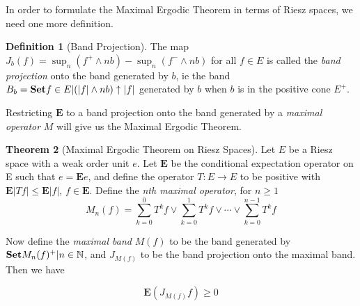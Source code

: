 \documentclass[letterpaper,10pt,oneside,onecolumn,reqno]{amsart}
\newcommand{\NN}{\mathbb N}
\theoremstyle{definition}
\newtheorem{thm}{Theorem}
\newtheorem{defn}[thm]{Definition}
\newcommand{\catname}[1]{{\normalfont\textbf{#1}}}
\newcommand{\Set}{\catname{Set}}
\begin{document}
In order to formulate the Maximal Ergodic Theorem in terms of Riesz spaces, we need one more definition. 

\begin{defn}[Band Projection]
The map $J_b(f) = \sup_n (f^+ \wedge nb) - \sup_n(f^- \wedge nb)$ for all $f \in E$ is called the \emph{band projection} onto the band generated by $b$, ie the band $B_b = \Set{f \in E | (|f| \wedge nb) \uparrow |f|}$ generated by $b$ when $b$ is in the positive cone $E^+$. 
\end{defn}

Restricting $\mathbf{E}$ to a band projection onto the band generated by a \emph{maximal operator} $M$ will give us the Maximal Ergodic Theorem.


\begin{thm}[Maximal Ergodic Theorem on Riesz Spaces]
Let $E$ be a Riesz space with a weak order unit $e$. Let $\mathbf{E}$ be the conditional expectation operator on E such that $e = \mathbf{E}e$, and define the operator $T : E \to E$ to be positive with $\mathbf{E}|Tf| \leq \mathbf{E}|f|$, $f \in \mathbf{E}$. Define the \emph{nth maximal operator}, for $n \geq 1$
\begin{equation}
M_n(f) = \sum\limits_{k=0}^{0} T^kf \vee \sum\limits_{k=0}^{1} T^kf \vee \cdots \vee \sum\limits_{k=0}^{n-1} T^kf
\end{equation}

Now define the \emph{maximal band} $M(f)$ to be the band generated by $\Set{M_n(f)^+ | n \in \NN}$, and $J_{M(f)}$ to be the band projection onto the maximal band. Then we have

\begin{equation}
\mathbf{E}(J_{M(f)}f) \geq 0
\end{equation}
\end{thm}
\end{document}
